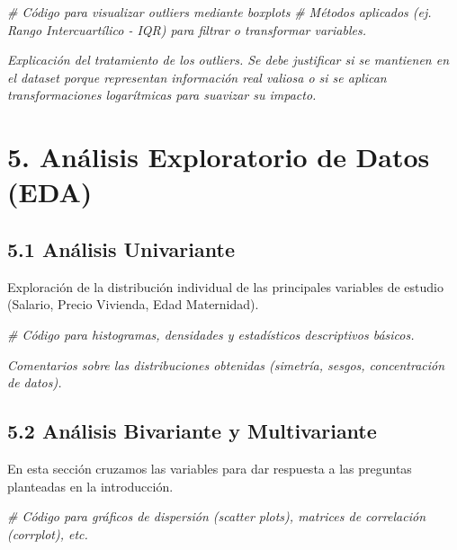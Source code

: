 \documentclass[data,article,submit,moreauthors,pdftex]{Definitions/mdpi}
\newenvironment{Shaded}{\begin{snugshade}}{\end{snugshade}}
\newcommand{\CommentTok}[1]{\textcolor[rgb]{0.56,0.35,0.01}{\textit{#1}}}
\begin{document}
\begin{Shaded}
\begin{Highlighting}[]
\CommentTok{\# Código para visualizar outliers mediante boxplots}
\CommentTok{\# Métodos aplicados (ej. Rango Intercuartílico {-} IQR) para filtrar o transformar variables.}
\end{Highlighting}
\end{Shaded}

\emph{Explicación del tratamiento de los outliers. Se debe justificar si
se mantienen en el dataset porque representan información real valiosa o
si se aplican transformaciones logarítmicas para suavizar su impacto.}

\section{5. Análisis Exploratorio de Datos
(EDA)}\label{anuxe1lisis-exploratorio-de-datos-eda}

\subsection{5.1 Análisis Univariante}\label{anuxe1lisis-univariante}

Exploración de la distribución individual de las principales variables
de estudio (Salario, Precio Vivienda, Edad Maternidad).

\begin{Shaded}
\begin{Highlighting}[]
\CommentTok{\# Código para histogramas, densidades y estadísticos descriptivos básicos.}
\end{Highlighting}
\end{Shaded}

\emph{Comentarios sobre las distribuciones obtenidas (simetría, sesgos,
concentración de datos).}

\subsection{5.2 Análisis Bivariante y
Multivariante}\label{anuxe1lisis-bivariante-y-multivariante}

En esta sección cruzamos las variables para dar respuesta a las
preguntas planteadas en la introducción.

\begin{Shaded}
\begin{Highlighting}[]
\CommentTok{\# Código para gráficos de dispersión (scatter plots), matrices de correlación (corrplot), etc.}
\end{Highlighting}
\end{Shaded}
\end{document}
